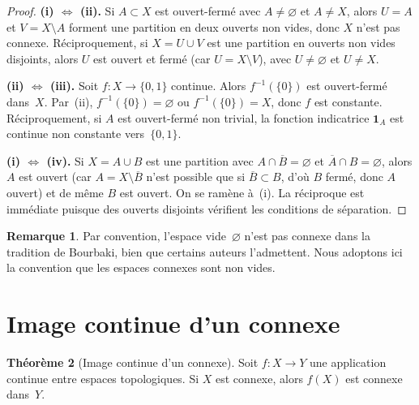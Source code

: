 \documentclass[12pt,a4paper,openany]{book}
\theoremstyle{definition}
\theoremstyle{cours}
\newtheorem{theoreme}{Théorème}[chapter]
\theoremstyle{coursnormal}
\newtheorem{remarque}[theoreme]{Remarque}
\begin{document}
\begin{proof}
\noindent\textbf{(i) $\Leftrightarrow$ (ii).}
Si $A \subset X$ est ouvert-fermé avec $A \neq \varnothing$ et $A \neq X$, alors
$U = A$ et $V = X \setminus A$ forment une partition en deux ouverts non vides, donc
$X$ n'est pas connexe. Réciproquement, si $X = U \cup V$ est une partition en
ouverts non vides disjoints, alors $U$ est ouvert et fermé (car $U = X \setminus V$),
avec $U \neq \varnothing$ et $U \neq X$.

\noindent\textbf{(ii) $\Leftrightarrow$ (iii).}
Soit $f \colon X \to \{0,1\}$ continue. Alors $f^{-1}(\{0\})$ est ouvert-fermé dans~$X$.
Par~(ii), $f^{-1}(\{0\}) = \varnothing$ ou $f^{-1}(\{0\}) = X$, donc $f$ est constante.
Réciproquement, si $A$ est ouvert-fermé non trivial, la fonction indicatrice
$\mathbf{1}_{A}$ est continue non constante vers~$\{0,1\}$.

\noindent\textbf{(i) $\Leftrightarrow$ (iv).}
Si $X = A \cup B$ est une partition avec $A \cap \overline{B} = \varnothing$ et
$\overline{A} \cap B = \varnothing$, alors $A$ est ouvert (car $A = X \setminus \overline{B}$
n'est possible que si $\overline{B} \subset B$, d'où $B$ fermé, donc $A$ ouvert) et
de même $B$ est ouvert. On se ramène à~(i). La réciproque est immédiate puisque
des ouverts disjoints vérifient les conditions de séparation.
\end{proof}

\begin{remarque}
\label{rem:connexe-non-vide}
Par convention, l'espace vide~$\varnothing$ n'est pas connexe dans la tradition
de Bourbaki, bien que certains auteurs l'admettent. Nous adoptons ici la convention
que les espaces connexes sont non vides.
\end{remarque}

\section{Image continue d'un connexe}
\label{sec:image-connexe}

\begin{theoreme}[Image continue d'un connexe]
\label{thm:image-connexe}
Soit $f \colon X \to Y$ une application continue entre espaces topologiques.
Si $X$ est connexe, alors $f(X)$ est connexe dans~$Y$.
\end{theoreme}
\end{document}
